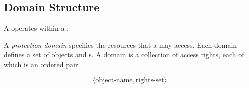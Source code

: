 \subsection{Domain Structure}\label{subsubsec:Domain_Structure}
A  operates within a .

\begin{definition}\label{def:Protection_Domain}
  A \emph{protection domain} specifies the resources that a  may access.
  Each domain defines a set of objects and s.
  A domain is a collection of access rights, each of which is an ordered pair

  \begin{equation}\label{eq:Protection_Domain}
    \langle \text{object-name}, \text{rights-set} \rangle
  \end{equation}
\end{definition}


